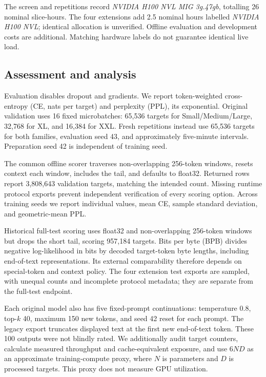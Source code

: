 \documentclass[10pt,twocolumn,letterpaper]{article}
\begin{document}
The screen and repetitions record \emph{NVIDIA H100 NVL MIG 3g.47gb}, totalling
26 nominal slice-hours. The four extensions add 2.5 nominal hours labelled
\emph{NVIDIA H100 NVL}; identical allocation is unverified. Offline evaluation
and development costs are additional. Matching hardware labels do not guarantee
identical live load.

\subsection{Assessment and analysis}

Evaluation disables dropout and gradients. We report token-weighted
cross-entropy (CE, nats per target) and perplexity (PPL), its exponential.
Original validation uses 16 fixed microbatches: 65,536 targets for
Small/Medium/Large, 32,768 for XL, and 16,384 for XXL. Fresh repetitions instead
use 65,536 targets for both families, evaluation seed 43, and approximately
five-minute intervals. Preparation seed 42 is independent of training seed.

The common offline scorer traverses non-overlapping 256-token windows, resets
context each window, includes the tail, and defaults to float32. Returned rows
report 3,808,643 validation targets, matching the intended count. Missing runtime
protocol exports prevent independent verification of every scoring option.
Across training seeds we report individual values, mean CE, sample standard
deviation, and geometric-mean PPL.

Historical full-test scoring uses float32 and non-overlapping 256-token windows
but drops the short tail, scoring 957,184 targets. Bits per byte (BPB) divides
negative log-likelihood in bits by decoded target-token byte lengths, including
end-of-text representations. Its external comparability therefore depends on
special-token and context policy. The four extension test exports are sampled,
with unequal counts and incomplete protocol metadata; they are separate from
the full-test endpoint.

Each original model also has five fixed-prompt continuations: temperature 0.8,
top-$k$ 40, maximum 150 new tokens, and seed 42 reset for each prompt. The legacy
export truncates displayed text at the first new end-of-text token. These 100
outputs were not blindly rated. We additionally audit target counters, calculate
measured throughput and cache-equivalent exposure, and use $6ND$ as an approximate
training-compute proxy, where $N$ is parameters and $D$ is processed targets.
This proxy does not measure GPU utilization.
\end{document}
